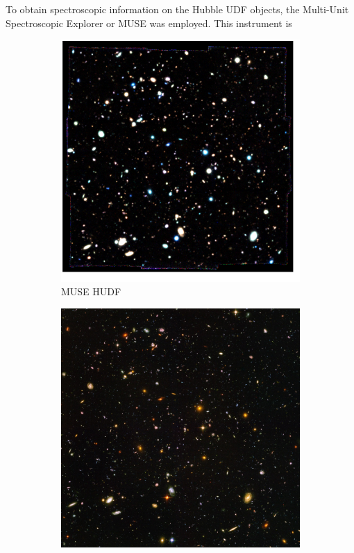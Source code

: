 \documentclass[12pt, twocolumn]{revtex4}    %
\begin{document}
To obtain spectroscopic information on the Hubble UDF objects, the Multi-Unit Spectroscopic Explorer or MUSE was employed. This instrument is 


\onecolumngrid

\begin{figure}
  \begin{subfigure}[b]{0.4\textwidth}
    \includegraphics[width=\textwidth]{introduction/muse_colour_image}
    \captionsetup{justification=justified}    
    \caption{MUSE HUDF}               
    \label{fig:muse_colour_image}
  \end{subfigure}
  \begin{subfigure}[b]{0.4\textwidth}
    \includegraphics[width=\textwidth]{introduction/hubble_ultra_deep_field}

\end{subfigure}
\end{figure}
\end{document}
